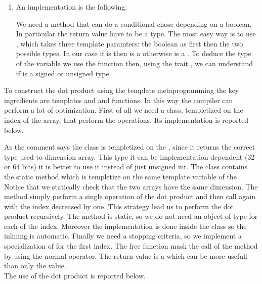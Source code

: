 \begin{enumerate}
    \item An implementation is the following:
    \lstset{basicstyle=\scriptsize\sf}
    
    \lstset{basicstyle=\sf}
    We need a method that can do a conditional chose depending on a boolean.
    In particular the return value have to be a type. The most easy way is to
    use , which takes three template paramters: the
    boolean as first then the two possible types. In our case if 
    is  then  is a  otherwise is a .
    To deduce the type of the variable  we use the function
     then, using the trait , we can understand
    if  is a signed or unsigned type.

\end{enumerate}

To construct the dot product using the template metaprogramming the key
ingredients are templates and  and  functions. In this way the
compiler can perform a lot of optimization. First of all we need a class,
templetized on the index of the array, that perform the operations.
Its implementation is reported below.
\lstset{basicstyle=\scriptsize\sf}

\lstset{basicstyle=\sf}
As the comment says the class is templetized on the , since it
returns the correct type used to dimension array. This type it can be
implementation dependent (32 or 64 bits) it is better to use it instead of just
unsigned int. The class  contains the static method 
which is templetize on the same template variable of the .
Notice that we statically check that the two arrays have the same dimension. The
method simply perform a single operation of the dot product and then call again
 with the index decreased by one. This strategy lead us to perform
the dot product recursively. The method is static, so we do not need an object
of type  for each of the index.  Moreover the implementation is
done inside the class so the inlining is automatic.  Finally we need a stopping
criteria, so we implement a specialization of  for the first index.
The free function  mask the call of the method  by
using the normal \cpp{*} operator. The return value is a  which
can be more usefull than only the value.\\
The use of the dot product is reported below.
\lstset{basicstyle=\scriptsize\sf}

\lstset{basicstyle=\sf}
